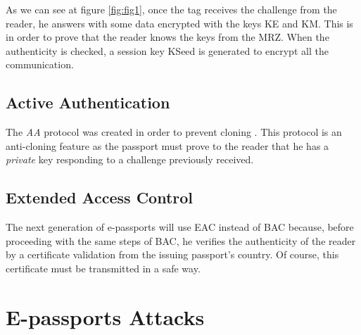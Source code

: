 \documentclass{acm_proc_article-sp}
\begin{document}
As we can see at figure 
\ref{fig:fig1}, 
once the tag receives the challenge from the reader, he answers 
with some data encrypted with the keys KE and KM. This is in order to prove that the reader knows the keys from the MRZ. When the authenticity is checked, a session key KSeed 
is generated to encrypt all the communication.

\subsection{Active Authentication}
The \textit{AA} protocol was created in order to prevent cloning \cite{JUAR2005}. 
This protocol is an anti-cloning feature as the passport must prove 
to the reader that he has a \emph{private} key responding to a challenge previously received.

\subsection{Extended Access Control}
The next generation of e-passports will use EAC 
instead of BAC \cite{NM12} because, before proceeding with the same steps of BAC, he verifies the 
authenticity of the reader by a certificate validation from the issuing passport’s country. Of course, this certificate must be transmitted in a safe way.


\section{E-passports Attacks}
\label{sec:sec3}
\end{document}

